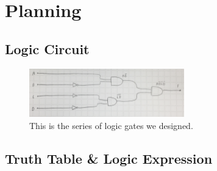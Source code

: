 \documentclass{article}
\begin{document}
\section{Planning}

\subsection{Logic Circuit}

\begin{figure}[!htb]
\centering
\includegraphics[width=0.6\textwidth]{logic.png}
\caption{\label{fig:logic}This is the series of logic gates we designed.}
\end{figure}

\subsection{Truth Table \& Logic Expression}
\end{document}
